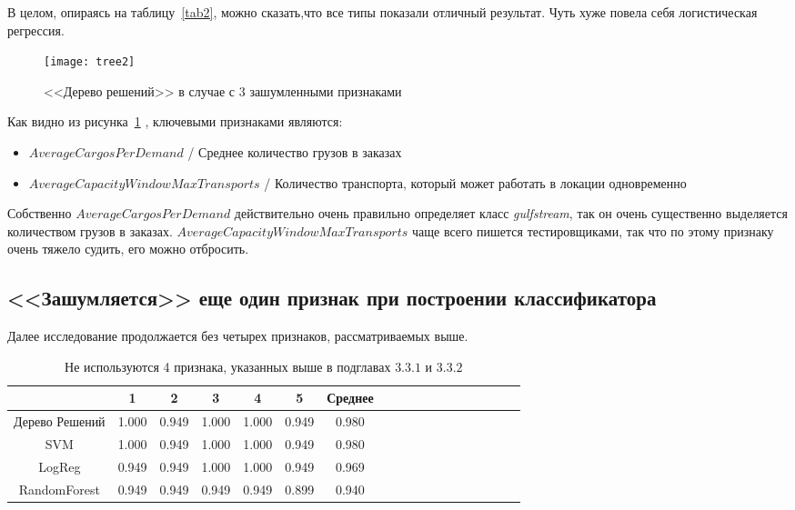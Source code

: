 В целом, опираясь на таблицу~\ref{tab2}, можно сказать,что все типы показали отличный результат.
Чуть хуже повела себя логистическая регрессия.

\begin{figure}[h]
	\caption{<<Дерево решений>> в случае с 3 зашумленными признаками \label{tree2}} \centering
	\texttt{[image: tree2]}
\end{figure}

Как видно из рисунка~\ref{tree2} , ключевыми признаками являются:

\begin{itemize}
	\item $AverageCargosPerDemand $ / Среднее количество грузов в заказах
	\item $AverageCapacityWindowMaxTransports$ / Количество транспорта, который может работать в локации одновременно
\end{itemize}

Собственно $AverageCargosPerDemand $ действительно очень правильно определяет класс \textit{gulfstream}, так он очень существенно выделяется количеством грузов в заказах.
$AverageCapacityWindowMaxTransports$ чаще всего пишется тестировщиками, так что по этому признаку очень тяжело судить, его можно отбросить.

\subsection{<<Зашумляется>> еще один признак при построении классификатора}

Далее исследование продолжается без четырех признаков, рассматриваемых выше.

\begin{table}[!h]
	\centering
	\caption{Не используются 4 признака, указанных выше в подглавах $3.3.1$ и $3.3.2$}\label{tab3}
	\begin{tabu}{|*{18}{c|}}\hline
	                          &  1  & 2 & 3 & 4 & 5 & Среднее \\\hline
	Дерево Решений & 1.000 & 0.949 & 1.000  & 1.000 & 0.949 & 0.980 \\\hline
	SVM                    &  1.000 & 0.949 & 1.000  & 1.000 & 0.949 & 0.980 \\\hline
	LogReg              & 0.949 & 0.949 & 1.000  & 1.000 & 0.949 & 0.969  \\\hline
	RandomForest &    0.949 & 0.949 & 0.949 &  0.949  & 0.899 & 0.940 \\\hline
\end{tabu}
\end{table}

